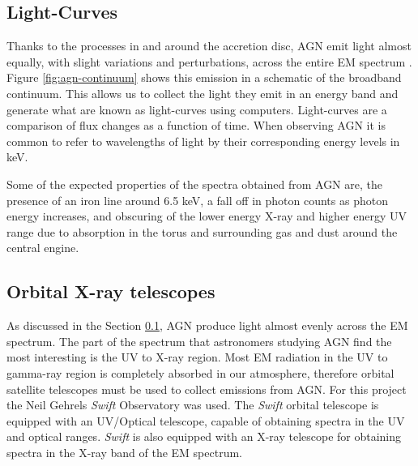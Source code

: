 \documentclass[12pt, oneside]{smuthesis}
\begin{document}
\subsection{\sc Light-Curves} \label{lightcurves}
Thanks to the processes in and around the accretion disc, AGN emit light almost equally, with slight variations and perturbations, across the entire EM spectrum \citep{koratkar}. Figure \ref{fig:agn-continuum} shows this emission in a schematic of the broadband continuum. This allows us to collect the light they emit in an energy band and generate what are known as light-curves using computers. Light-curves are a comparison of flux changes as a function of time. When observing AGN it is common to refer to wavelengths of light by their corresponding energy levels in keV.

Some of the expected properties of the spectra obtained from AGN are, the presence of an iron line around 6.5 keV, a fall off in photon counts as photon energy increases, and obscuring of the lower energy X-ray and higher energy UV range due to absorption in the torus and surrounding gas and dust around the central engine.

\subsection{\sc Orbital X-ray telescopes} \label{xrayTelesopes}

As discussed in the Section \ref{lightcurves}, AGN produce light almost evenly across the EM spectrum. The part of the spectrum that astronomers studying AGN find the most interesting is the UV to X-ray region. Most EM radiation in the UV to gamma-ray region is completely absorbed in our atmosphere, therefore orbital satellite telescopes must be used to collect emissions from AGN. For this project the Neil Gehrels \textit{Swift} Observatory was used. The \textit{Swift} orbital telescope is equipped with an UV/Optical telescope, capable of obtaining spectra in the UV and optical ranges. \textit{Swift} is also equipped with an X-ray telescope for obtaining spectra in the X-ray band of the EM spectrum. 
\end{document}
